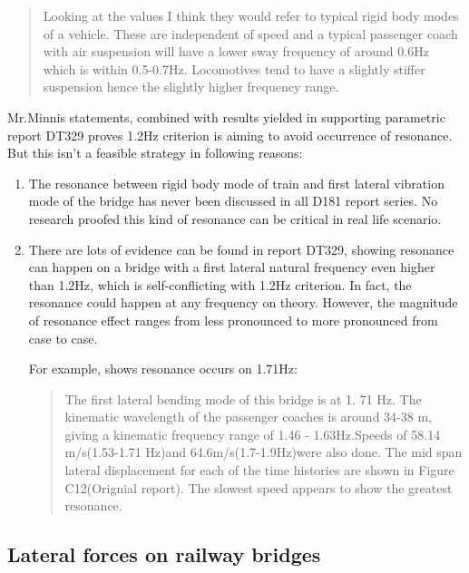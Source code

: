 \begin{quote}
Looking at the values I think they would refer to typical rigid body modes of a vehicle.  These are independent of speed and a typical passenger coach with air suspension will have a lower sway frequency of around 0.6Hz which is within 0.5-0.7Hz.  Locomotives tend to have a slightly stiffer suspension hence the slightly higher frequency range.
\end{quote}

Mr.Minnis statements, combined with results yielded in supporting parametric report DT329 proves 1.2Hz criterion is aiming to avoid occurrence of resonance. But this isn't a feasible strategy in following reasons:

\begin{enumerate} 
    \item The resonance between rigid body mode of train and first lateral vibration mode of the bridge has never been discussed in all D181 report series. No research proofed this kind of resonance can be critical in real life scenario.

    \item There are lots of evidence can be found in report DT329, showing resonance can happen on a bridge with a first lateral natural frequency even higher than 1.2Hz, which is self-conflicting with 1.2Hz criterion. In fact, the resonance could happen at any frequency on theory. However, the magnitude of resonance effect ranges from less pronounced to more pronounced from case to case.  

    For example, \cite[Page 14,Phase II]{d181dt329} shows resonance occurs on 1.71Hz:
        \begin{quote}
            The first lateral bending mode of this bridge is at 1. 71 Hz. The kinematic wavelength of the passenger coaches is around 34-38 m, giving a kinematic frequency range of 1.46 - 1.63Hz.Speeds of 58.14 m/s(1.53-1.71 Hz)and 64.6m/s(1.7-1.9Hz)were also done. The mid span lateral displacement for each of the time histories are shown in Figure C12(Orignial report). The slowest speed appears to show the greatest resonance.
        \end{quote}
\end{enumerate}

\subsection{Lateral forces on railway bridges}\label{sec:lateralforce329}

